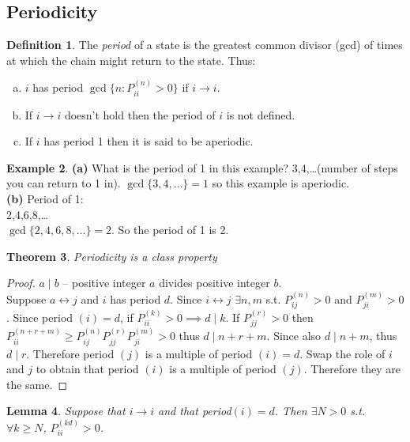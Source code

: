 \documentclass{article}
\newtheorem{thm}{Theorem}
\newtheorem{lem}[thm]{Lemma}
\theoremstyle{definition}
\newtheorem{defn}[thm]{Definition}
\newtheorem{ex}[thm]{Example}
\begin{document}
\subsection*{Periodicity}
\begin{defn}
The \emph{period} of a state is the greatest common divisor (gcd) of times at which the chain might return to the state. Thus:
\begin{enumerate}[(a)]
\item $i$ has period $\gcd\{n \colon P_{ii}^{(n)} > 0\}$ if $i \rightarrow i$.
\item If $i\rightarrow i$ doesn't hold then the period of $i$ is not defined.
\item If $i$ has period 1 then it is said to be aperiodic.
\end{enumerate}
\end{defn}

\begin{ex}
\textbf{(a)}
What is the period of 1 in this example? 3,4,\ldots (number of steps you can return to 1 in).
$\gcd\{3,4,\ldots\} = 1$ so this example is aperiodic.\\
\textbf{(b)}
Period of 1: \\
2,4,6,8,\ldots \\
$\gcd\{2,4,6,8,\ldots\} = 2$.
So the period of 1 is 2.
\end{ex}

\begin{thm} Periodicity is a class property \end{thm}
\begin{proof}
$a\mid b$ -- positive integer $a$ divides positive integer $b$. \\
Suppose $a\leftrightarrow j$ and $i$ has period $d$.
Since $i\leftrightarrow j$ $\exists n,m$ s.t. $P_{ij}^{(n)} > 0$ and $P_{ji}^{(m)}>0$.
Since period $(i) = d$, if $P_{ii}^{(k)}>0 \implies d\mid k$.
If $P_{jj}^{(r)}> 0$ then $P_{ii}^{(n+r+m)} \ge P_{ij}^{(n)}P_{jj}^{(r)}P_{ji}^{(m)}>0$ thus $d\mid n+r+m$.
Since also $d\mid n+m$, thus $d\mid r$.
Therefore period $(j)$ is a multiple of period $(i) = d$.
Swap the role of $i$ and $j$ to obtain that period $(i)$ is a multiple of period $(j)$.
Therefore they are the same.
\end{proof}

\begin{lem}
Suppose that $i\rightarrow i$ and that period$(i) = d$.
Then $\exists N>0$ s.t. $\forall k\ge N$, $P_{ii}^{(kd)} >0$.
\end{lem}
\end{document}
